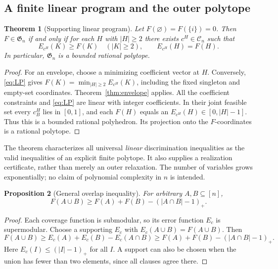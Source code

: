 \documentclass[10pt,a4paper]{amsart}
\newtheorem{theorem}{Theorem}[section]
\newtheorem{proposition}[theorem]{Proposition}
\newcommand{\1}{\mathbf 1}
\newcommand{\Coeff}{\mathcal C}
\newcommand{\Greg}{\mathfrak G}
\begin{document}
\subsection{A finite linear program and the outer polytope}

\begin{theorem}[Supporting linear program]\label{thm:LP}
Let $F(\varnothing)=F(\{i\})=0$. Then $F\in\Greg_n$ if and only if for each
$H$ with $|H|\ge2$ there exists $c^H\in\Coeff_n$ such that
\begin{equation}\label{eq:LP}
 E_{c^H}(K)\ge F(K)\quad(|K|\ge2),\qquad E_{c^H}(H)=F(H).
\end{equation}
In particular, $\Greg_n$ is a bounded rational polytope.
\end{theorem}
\begin{proof}
For an envelope, choose a minimizing coefficient vector at $H$. Conversely,
\eqref{eq:LP} gives $F(K)=\min_{|H|\ge2}E_{c^H}(K)$, including the fixed
singleton and empty-set coordinates. Theorem~\ref{thm:envelope} applies.
All the coefficient constraints and \eqref{eq:LP} are linear with integer
coefficients. In their joint feasible set every $c_B^H$ lies in $[0,1]$, and
each $F(H)$ equals an $E_{c^H}(H)\in[0,|H|-1]$. Thus this is a bounded rational
polyhedron. Its projection onto the $F$-coordinates is a rational polytope.
\end{proof}

The theorem characterizes all universal \emph{linear} discrimination
inequalities as the valid inequalities of an explicit finite polytope. It also
supplies a realization certificate, rather than merely an outer relaxation.
The number of variables grows exponentially; no claim of polynomial complexity
in $n$ is intended.

\begin{proposition}[General overlap inequality]\label{prop:overlap}
For arbitrary $A,B\subseteq[n]$,
\begin{equation}\label{eq:overlap}
 F(A\cup B)\ge F(A)+F(B)-(|A\cap B|-1)_+.
\end{equation}
\end{proposition}
\begin{proof}
Each coverage function is submodular, so its error function $E_c$ is
supermodular. Choose a supporting $E_c$ with $E_c(A\cup B)=F(A\cup B)$.
Then
\[
 F(A\cup B)\ge E_c(A)+E_c(B)-E_c(A\cap B)
 \ge F(A)+F(B)-(|A\cap B|-1)_+.
\]
Here $E_c(I)\le(|I|-1)_+$ for all $I$. A support can also be chosen when the
union has fewer than two elements, since all clauses agree there.
\end{proof}
\end{document}
